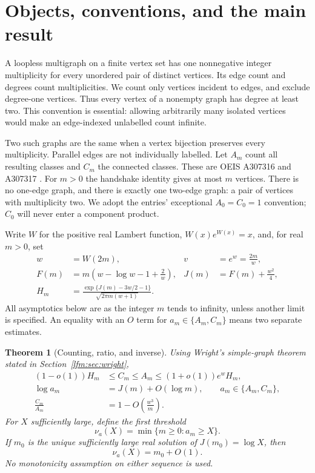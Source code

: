 \documentclass[11pt,letterpaper]{article}
\newtheorem{theorem}{Theorem}[section]
\theoremstyle{remark}\newtheorem{remark}[theorem]{Remark}
\begin{document}
\section{Objects, conventions, and the main result}
A loopless multigraph on a finite vertex set has one nonnegative integer multiplicity for every unordered pair of distinct vertices. Its edge count and degrees count multiplicities. We count only vertices incident to edges, and exclude degree-one vertices. Thus every vertex of a nonempty graph has degree at least two. This convention is essential: allowing arbitrarily many isolated vertices would make an edge-indexed unlabelled count infinite.

Two such graphs are the same when a vertex bijection preserves every multiplicity. Parallel edges are not individually labelled. Let $A_m$ count all resulting classes and $C_m$ the connected classes. These are OEIS A307316 and A307317 \cite{oeisA,oeisC}. For $m>0$ the handshake identity gives at most $m$ vertices. There is no one-edge graph, and there is exactly one two-edge graph: a pair of vertices with multiplicity two. We adopt the entries' exceptional $A_0=C_0=1$ convention; $C_0$ will never enter a component product.

Write $W$ for the positive real Lambert function, $W(x)e^{W(x)}=x$, and, for real $m>0$, set
\begin{align}
 w&=W(2m),& v&=e^w=\frac{2m}{w},\label{lfm:eq:wv}\\
 F(m)&=m\left(w-\log w-1+\frac2w\right),&
 J(m)&=F(m)+\frac{w^2}{4},\label{lfm:eq:FJ}\\
 H_m&=\frac{\exp\{J(m)-3w/2-1\}}{\sqrt{2\pi m(w+1)}}.\label{lfm:eq:H}
\end{align}
All asymptotics below are as the integer $m$ tends to infinity, unless another limit is specified. An equality with an $O$ term for $a_m\in\{A_m,C_m\}$ means two separate estimates.

\begin{theorem}[Counting, ratio, and inverse]\label{lfm:thm:main}
Using Wright's simple-graph theorem stated in Section~\ref{lfm:sec:wright},
\begin{align}
 (1-o(1))H_m&\le C_m\le A_m\le(1+o(1))e^wH_m,\label{lfm:eq:sandwich}\\
 \log a_m&=J(m)+O(\log m),\qquad a_m\in\{A_m,C_m\},\label{lfm:eq:log}\\
 \frac{C_m}{A_m}&=1-O\left(\frac{w^3}{m}\right).\label{lfm:eq:ratio}
\end{align}
For $X$ sufficiently large, define the first threshold
\[
 \nu_a(X)=\min\{m\ge0:a_m\ge X\}.
\]
If $m_0$ is the unique sufficiently large real solution of $J(m_0)=\log X$, then
\begin{equation}
 \nu_a(X)=m_0+O(1).\label{lfm:eq:inverse}
\end{equation}
No monotonicity assumption on either sequence is used.
\end{theorem}
\end{document}
